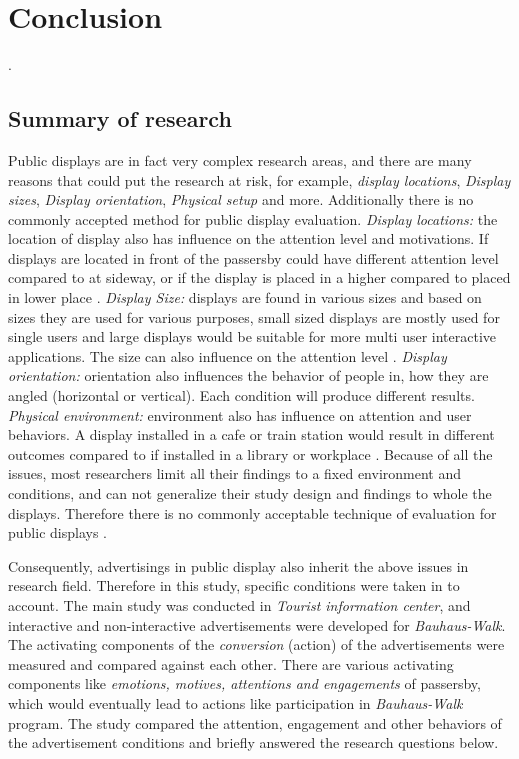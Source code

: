 \chapter{Conclusion} %

\label{Chapter10} %
\newpage
.
\newpage

\section{Summary of research}

Public displays are in fact very complex research areas, and there are many reasons that could put the research at risk, for example, \emph{display locations}, \emph{Display sizes}, \emph{ Display orientation}, \emph{Physical setup} and more. Additionally there is no commonly accepted method for public display evaluation. \emph{Display locations:} the location of display also has influence on the attention level and motivations. If displays are located in front of the passersby could have different attention level compared to at sideway, or if the display is placed in a higher compared to placed in lower place \cite{WhenPublicDisplays}. \emph{Display Size:} displays are found in various sizes and based on sizes they are used for various purposes, small sized displays are mostly used for single users and large displays would be suitable for more multi user interactive applications. The size can also influence on the attention level \cite{WhenPublicDisplays}. \emph{Display orientation:} orientation also influences the behavior of people in, how they are angled (horizontal or vertical). Each condition will produce different results\cite{DisplayAngleEffect}. \emph{Physical environment:} environment also has influence on attention and user behaviors. A display installed in a cafe or train station\cite{multimediaworkplace} would result in different outcomes compared to if installed in a library or workplace \cite{multimediaworkplace, semidisplay }. Because of all the issues, most researchers limit all their findings to a fixed environment and conditions, and can not generalize their study design and findings to whole the displays.  Therefore there is no commonly acceptable technique of evaluation for public displays \cite{HowToEvaluate}.

Consequently, advertisings in public display also inherit the above issues in research field. Therefore in this study, specific conditions were taken in to account. The main study was conducted in \emph{Tourist information center}, and interactive and non-interactive advertisements were developed for \emph{Bauhaus-Walk}. The activating components of the \emph{conversion} (action) of the advertisements were measured and compared against each other. There are various activating components like \emph{emotions, motives, attentions and engagements} of passersby, which would eventually lead to actions like participation in \emph{Bauhaus-Walk} program. The study compared the attention, engagement and other behaviors of the advertisement conditions and briefly answered the research questions below.





